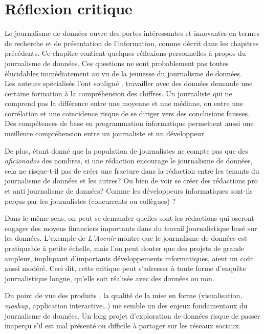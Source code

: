 
\chapter{Réflexion critique}

Le journalisme de données ouvre des portes intéressantes et innovantes en termes de
recherche et de présentation de l'information, comme décrit dans les chapitres 
précédents. Ce chapitre contient quelques réflexions personnelles à propos du journalisme 
de données. Ces questions ne sont probablement pas toutes élucidables immédiatement
au vu de la jeunesse du journalisme de données.
\\

Les auteurs spécialisés l'ont souligné \cite{handbook, bradshaw, meyer}, travailler
avec des données demande une certaine formation à la compréhension des chiffres. Un 
journaliste qui ne comprend pas la différence entre une moyenne et une médiane, 
ou entre une corrélation et une coïncidence risque de se diriger vers des conclusions
fausses. Des compétences de base en programmation informatique permettent aussi
une meilleure compréhension entre un journaliste et un développeur.

De plus, étant donné que la population de journalistes ne compte pas que des 
\textit{aficionados} 
des nombres, si une rédaction encourage le journalisme de données, cela ne risque-t-il 
pas de créer une fracture dans la rédaction entre les tenants du journalisme de données 
et les autres? Ou bien de voir se créer des rédactions \og pro \fg et \og anti \fg 
journalisme de données? Comme les développeurs informatiques sont-ils perçus par 
les journalistes (concurrents ou collègues) ?

Dans le même sens, on peut se demander quelles sont les rédactions qui oseront 
engager des moyens financiers importants dans du travail journalistique basé sur les 
données. L'exemple de \textit{L'Avenir} montre que le journalisme de données est 
pratiquable à petite échelle, mais l'on peut douter que des projets de grande ampleur,
impliquant d'importants développements informatiques, aient un coût aussi modéré. Ceci 
dit, cette critique peut s'adresser à toute forme d'enquête journalistique longue,
qu'elle soit réalisée avec des données ou non.

Du point de vue des \og produits \fg, la qualité de la mise en forme
(visualisation, \textit{mashup}, application interactive\dots) me semble un des enjeux
fondamentaux du journalisme de données. Un long projet d'exploration de données
risque de passer inaperçu s'il est mal présenté ou difficile à partager sur
les réseaux sociaux. 

